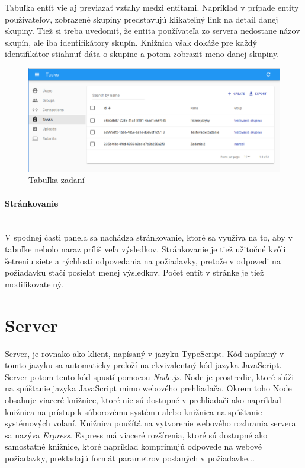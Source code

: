 Tabuľka entít vie aj previazať vzťahy medzi entitami. Napríklad v prípade entity používateľov, 
zobrazené skupiny predstavujú klikateľný link na detail danej skupiny. Tiež si treba uvedomiť, že
entita používateľa zo servera nedostane názov skupín, ale iba identifikátory skupín. Knižnica 
však dokáže pre každý identifikátor stiahnuť dáta o skupine a potom zobraziť meno danej skupiny.
\begin{figure}[H]
\centerline{\includegraphics[width=1\textwidth]{images/zadania}}
\caption[Tabuľka zadaní]{Tabuľka zadaní}
\label{obr:zadania}
\end{figure}

\paragraph{Stránkovanie}\leavevmode\\
V spodnej časti panela sa nachádza stránkovanie, ktoré sa využíva na to, aby v tabuľke nebolo naraz
príliš veľa výsledkov. Stránkovanie je tiež užitočné kvôli šetreniu siete a rýchlosti odpovedania na
požiadavky, pretože v odpovedi na požiadavku stačí posielať menej výsledkov. Počet entít v stránke
je tiež modifikovateľný.

\section{Server}
Server, je rovnako ako klient, napísaný v jazyku TypeScript. Kód napísaný v tomto jazyku sa
automaticky preloží na ekvivalentný kód jazyka JavaScript. Server potom tento kód spustí pomocou
\textit{Node.js}. Node je prostredie, ktoré slúži na spúštanie jazyka JavaScript mimo webového
prehliadača. Okrem toho Node obsahuje viaceré knižnice, ktoré nie sú dostupné v prehliadači ako
napríklad knižnica na prístup k súborovému systému alebo knižnica na spúštanie systémových volaní.
Knižnica použítá na vytvorenie webového rozhrania servera sa nazýva \textit{Express}. Express má
viaceré rozšírenia, ktoré sú dostupné ako samostatné knižnice, ktoré napríklad komprimujú odpovede
na webové požiadavky, prekladajú formát parametrov poslaných v požiadavke...

